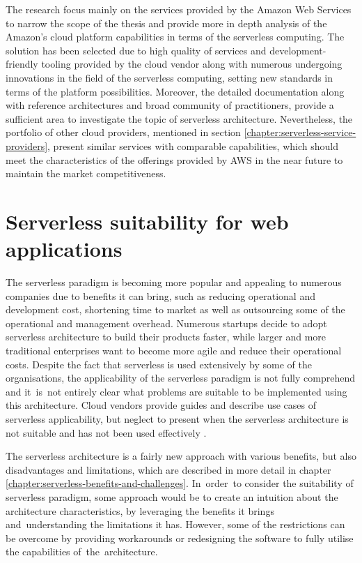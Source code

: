 The research focus mainly on the services provided by the Amazon Web Services to narrow the scope of the thesis and provide more in depth analysis of the Amazon's cloud platform capabilities in terms of the serverless computing.
The solution has been selected due to high quality of services and development-friendly tooling provided by the cloud vendor along with numerous undergoing innovations in the field of the serverless computing, setting new standards in terms of the platform possibilities.
Moreover, the detailed documentation along with reference architectures and broad community of practitioners, provide a sufficient area to investigate the topic of serverless architecture.
Nevertheless, the portfolio of other cloud providers, mentioned in section \ref{chapter:serverless-service-providers}, present similar services with comparable capabilities, which should meet the characteristics of the offerings provided by AWS in the near future to maintain the market competitiveness.

\section{Serverless suitability for web applications} \label{chapter:serverless-suitability}

The serverless paradigm is becoming more popular and appealing to numerous companies due to benefits it can bring, such as reducing operational and development cost, shortening time to market as well as outsourcing some of the operational and management overhead.
Numerous startups decide to adopt serverless architecture to build their products faster, while larger and more traditional enterprises want to become more agile and reduce their operational costs.
Despite the fact that serverless is used extensively by some of the organisations, the applicability of the serverless paradigm is not fully comprehend and it~is~not entirely clear what problems are suitable to be implemented using this architecture.
Cloud vendors provide guides and describe use cases of serverless applicability, but neglect to present when the serverless architecture is not suitable and has not been used effectively \cite{EvaluationOfServerlessApplicationProgrammingModel}.

The serverless architecture is a fairly new approach with various benefits, but also disadvantages and limitations, which are described in more detail in chapter \ref{chapter:serverless-benefits-and-challenges}.
In~order~to consider the suitability of serverless paradigm, some approach would be to create an intuition about the architecture characteristics, by leveraging the benefits it brings and~understanding the limitations it has.
However, some of the restrictions can be overcome by providing workarounds or redesigning the software to fully utilise the capabilities of~the~architecture.


